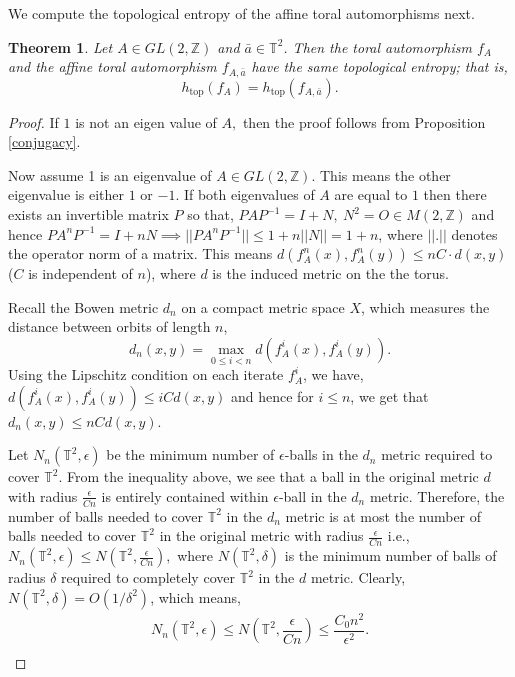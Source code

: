 \documentclass[12pt]{amsart}
\theoremstyle{plain}
\newtheorem{theorem}{Theorem}[section]
\theoremstyle{definition}
\theoremstyle{remark}
\begin{document}
We compute the topological entropy of the affine toral automorphisms next.  

\begin{theorem}\label{top entrpy}
   Let $A \in GL(2,\mathbb{Z})$ and $\bar{a} \in \mathbb{T}^2$. Then the toral automorphism $f_A$ and the affine toral automorphism $f_{A,\bar{a}}$ have the same topological entropy; that is,
\[
h_{\mathrm{top}}(f_A) = h_{\mathrm{top}}(f_{A,\bar{a}}).
\]
 
\end{theorem}
\begin{proof}
If $1$ is not an eigen value of $A,$ then the proof follows from Proposition \ref{conjugacy}.    

Now assume 1 is an eigenvalue of $A \in GL(2,\mathbb{Z})$. This means the other eigenvalue is either $1$ or $-1$. If both eigenvalues of $A$ are equal to $1$ then there exists an invertible matrix $P$ so that, $PAP^{-1}=I+N, ~N^2=O \in M(2, \mathbb Z)$ and hence $PA^nP^{-1}=I+nN \implies ||PA^nP^{-1}|| \leq 1+n||N||=1+n$, where $||.||$ denotes the operator norm of a matrix. This means $d(f_A^n(x),f_A^n(y))\leq nC \cdot d(x,y)$ ($C$ is independent of $n$), where $d$ is the induced metric on the the torus.

Recall the Bowen metric $d_n$ on a compact metric space $X$, which measures the distance between orbits of length $n$,  $$d_n(x, y) = \max_{0 \leq i < n} d(f_A^i(x), f_A^i(y)).$$ Using the Lipschitz condition on each iterate $f_A^i$, we have,  $d(f_A^i(x), f_A^i(y))  \leq iC  d(x, y)$ and hence for $i \leq n$, we get that $d_n(x, y) \leq nC  d(x, y)$.

Let $N_n(\mathbb{T}^2, \epsilon)$ be the minimum number of $\epsilon$-balls in the $d_n$ metric required to cover $\mathbb{T}^2$. From the inequality above, we see that a ball in the original metric $d$ with radius $ \frac{\epsilon}{Cn}$ is entirely contained within $\epsilon$-ball in the $d_n$ metric. Therefore, the number of balls needed to cover $\mathbb{T}^2$ in the $d_n$ metric is at most the number of balls needed to cover $\mathbb{T}^2$ in the original metric with radius $\frac{\epsilon}{Cn}$ i.e., $N_n(\mathbb{T}^2, \epsilon) \leq N\left(\mathbb{T}^2, \frac{\epsilon}{Cn}\right),$ where $N(\mathbb{T}^2, \delta)$ is the minimum number of balls of radius $\delta$ required to completely cover   $\mathbb{T}^2$ in the $d$ metric. Clearly, $N(\mathbb{T}^2, \delta)=O(1/\delta^2)$, which means, 
\[
\begin{array}{c}
N_n(\mathbb{T}^2, \epsilon)
\leq N\!\left(\mathbb{T}^2, \dfrac{\epsilon}{Cn}\right)
\leq \dfrac{C_0 n^2}{\epsilon^2}. \\[0.6em]
\end{array}
\]


\end{proof}
\end{document}

